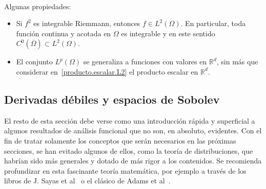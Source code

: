 \documentclass[11pt]{article}
\theoremstyle{plain}
\theoremstyle{definition}
\newcounter{stepnum}[section]
\newcommand{\step}[1][]{\bigskip\noindent\textbf{\thesection.\refstepcounter{stepnum}\thestepnum}.\enspace{#1}}
\renewcommand{\step}[1][]{\paragraph{#1}\hspace{-1.1em}}
\newcommand{\R}{\ensuremath{\mathbb{R}}}
\begin{document}
\step
Algunas propiedades:
\begin{itemize}
  \item 
Si $f^2$ es integrable Riemmann, entonces $f\in L^2(\Omega)$. En particular, toda función continua y acotada en $\Omega$ es integrable y en este sentido $C^0(\overline\Omega)\subset L^2(\Omega)$.
  \item El conjunto $L^p(\Omega)$ se generaliza a funciones con valores en $\R^d$, sin más que considerar en~\eqref{producto.escalar.L2} el producto escalar en $\R^d$.
\end{itemize}

\subsection*{Derivadas débiles y espacios de Sobolev}
El resto de esta sección debe verse como una introducción rápida y superficial a algunos resultados de análisis funcional que no son, en absoluto, evidentes. Con el fin de tratar solamente los conceptos que serán necesarios en las próximas secciones, se han evitado algunos de ellos, como la teoría de distribuciones, que habrían sido más generales y dotado de más rigor a los contenidos. Se recomienda profundizar en esta fascinante teoría matemática, por ejemplo a través de los libros de J. Sayas et al~\cite{sayas2019variational} o el clásico de Adams et al~\cite{adams2003sobolev}.
\end{document}
